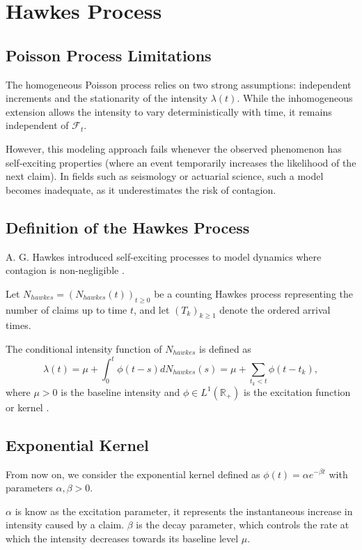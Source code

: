 \documentclass[a4paper,11pt]{article}
\begin{document}
\section{Hawkes Process}
\subsection{Poisson Process Limitations}

The homogeneous Poisson process relies on two strong assumptions: independent increments and the stationarity of the intensity $\lambda(t)$. While the inhomogeneous extension allows the intensity to vary deterministically with time, it remains independent of $\mathcal{F}_t$.

However, this modeling approach fails whenever the observed phenomenon has self-exciting properties (where an event temporarily increases the likelihood of the next claim). In fields such as seismology or actuarial science, such a model becomes inadequate, as it underestimates the risk of contagion.

\subsection{Definition of the Hawkes Process}

A. G. Hawkes introduced self-exciting processes to model dynamics where contagion is non-negligible \cite{hawkes1974}.

Let $N_{hawkes} = (N_{hawkes}(t))_{t \geq 0}$ be a counting Hawkes process representing the number of claims up to time $t$, and let $ (T_k)_{k \geq 1}$ denote the ordered arrival times.

The conditional intensity function of $N_{hawkes}$ is defined as
$$
\lambda(t) = \mu + \int_0^t \phi(t - s) dN_{hawkes}(s) = \mu + \sum_{t_k < t} \phi(t - t_k),
$$
where $\mu > 0$ is the baseline intensity and $\phi \in L^1(\mathbb{R}_+)$ is the excitation function or kernel \cite{bacry2015}.

\subsection{Exponential Kernel}

From now on, we consider the exponential kernel defined as $\phi(t) = \alpha e^{-\beta t}$ with parameters $\alpha, \beta > 0$.

$\alpha$ is know as the excitation parameter, it represents the instantaneous increase in intensity caused by a claim. $\beta$ is the decay parameter, which controls the rate at which the intensity decreases towards its baseline level $\mu$.
\end{document}

